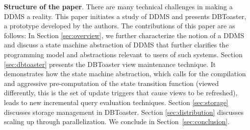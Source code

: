 {\bf Structure of the paper}\/.
There are many technical challenges in making a DDMS a reality. This paper
initiates a study of DDMS and presents DBToaster, a prototype developed by the
authors. The contributions of this paper are as follows: In Section
\ref{sec:overview}, we further characterize the notion of a DDMS and discuss a
state machine abstraction of DDMS that further clarifies the programming
model and abstractions relevant to users of such systems.
Section \ref{sec:dbtoaster} presents the DBToaster view maintenance technique.
It demonstrates how the state machine abstraction, which calls for the
compilation and aggressive pre-computation
of the state transition function (viewed differently, this is the set of update triggers that cause views to be refreshed), leads to new incremental
query evaluation techniques.
Section \ref{sec:storage} discusses storage management in DBToaster.
Section \ref{sec:distribution} discusses scaling up through
parallelization.
We conclude in Section~\ref{sec:conclusion}.


